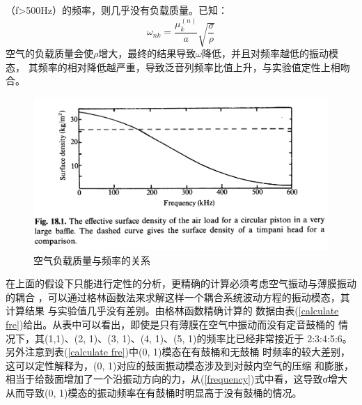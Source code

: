 \documentclass[a4paper]{ctexart}
\begin{document}
	（f>500Hz）的频率，则几乎没有负载质量。已知：
	\begin{equation}
		\omega_{nk} = \frac{\mu_{k}^{(n)}}{a}\sqrt{\frac{\sigma}{\rho}}
		\label{frequency}
	\end{equation}
	空气的负载质量会使$\rho$增大，最终的结果导致$\omega$降低，并且对频率越低的振动模态，
	其频率的相对降低越严重，导致泛音列频率比值上升，与实验值定性上相吻合。
	\begin{figure}[htbp]
		\includegraphics[scale=0.32]{effective_mass.png}
		\centering 
		\caption{空气负载质量与频率的关系\cite{a}}
		\label{air loading p}
	\end{figure}
	\par 
	在上面的假设下只能进行定性的分析，更精确的计算必须考虑空气振动与薄膜振动的耦合
	，可以通过格林函数法来求解这样一个耦合系统波动方程的振动模态，其计算结果
	与实验值几乎没有差别\cite{Christian1984Effects}。由格林函数精确计算的
	数据由表(\ref{calculate fre})给出。从表中可以看出，即使是只有薄膜在空气中振动而没有定音鼓桶的
	情况下，其(1,1)、(2, 1)、(3, 1)、(4, 1)、(5, 1)的频率比已经非常接近于
	2:3:4:5:6。另外注意到表(\ref{calculate fre})中(0, 1)模态在有鼓桶和无鼓桶
	时频率的较大差别，这可以定性解释为，(0, 1)对应的鼓面振动模态涉及到对鼓内空气的压缩
	和膨胀，相当于给鼓面增加了一个沿振动方向的力，从(\ref{frequency})式中看，这导致σ增大
	从而导致(0, 1)模态的振动频率在有鼓桶时明显高于没有鼓桶的情况。
\end{document}
